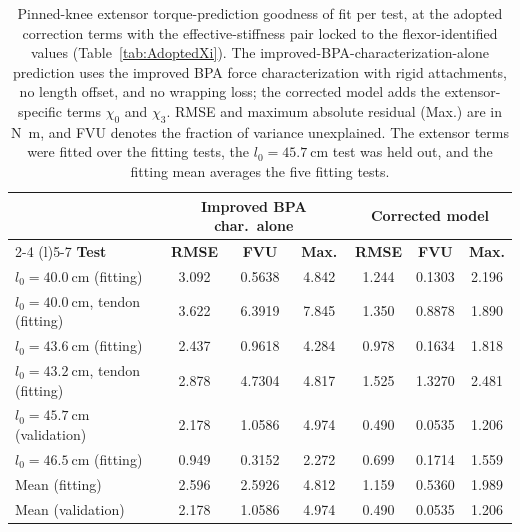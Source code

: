 \begin{table}[htbp]
\caption{Pinned-knee extensor torque-prediction goodness of fit per test, at the adopted correction terms with the effective-stiffness pair locked to the flexor-identified values (Table~\ref{tab:AdoptedXi}). The improved-BPA-characterization-alone prediction uses the improved BPA force characterization with rigid attachments, no length offset, and no wrapping loss; the corrected model adds the extensor-specific terms $\chi_{0}$ and $\chi_{3}$. RMSE and maximum absolute residual (Max.) are in \unit{\newton\meter}, and FVU denotes the fraction of variance unexplained. The extensor terms were fitted over the fitting tests, the $l_{0}=\qty{45.7}{\cm}$ test was held out, and the fitting mean averages the five fitting tests.}
\label{tab:ExtPinGof}
\begin{tabular}{@{}lcccccc@{}}
\toprule
& \multicolumn{3}{c}{\textbf{Improved BPA char.\ alone}} & \multicolumn{3}{c}{\textbf{Corrected model}} \\
\cmidrule(lr){2-4} \cmidrule(l){5-7}
\textbf{Test} & \textbf{RMSE} & \textbf{FVU} & \textbf{Max.} & \textbf{RMSE} & \textbf{FVU} & \textbf{Max.} \\
\midrule
$l_{0}=\qty{40.0}{\cm}$ (fitting)          & 3.092 & 0.5638 & 4.842 & 1.244 & 0.1303 & 2.196 \\
$l_{0}=\qty{40.0}{\cm}$, tendon (fitting)  & 3.622 & 6.3919 & 7.845 & 1.350 & 0.8878 & 1.890 \\
$l_{0}=\qty{43.6}{\cm}$ (fitting)          & 2.437 & 0.9618 & 4.284 & 0.978 & 0.1634 & 1.818 \\
$l_{0}=\qty{43.2}{\cm}$, tendon (fitting)  & 2.878 & 4.7304 & 4.817 & 1.525 & 1.3270 & 2.481 \\
$l_{0}=\qty{45.7}{\cm}$ (validation)       & 2.178 & 1.0586 & 4.974 & 0.490 & 0.0535 & 1.206 \\
$l_{0}=\qty{46.5}{\cm}$ (fitting)          & 0.949 & 0.3152 & 2.272 & 0.699 & 0.1714 & 1.559 \\
\midrule
Mean (fitting)                             & 2.596 & 2.5926 & 4.812 & 1.159 & 0.5360 & 1.989 \\
Mean (validation)                          & 2.178 & 1.0586 & 4.974 & 0.490 & 0.0535 & 1.206 \\
\bottomrule
\end{tabular}
\end{table}

